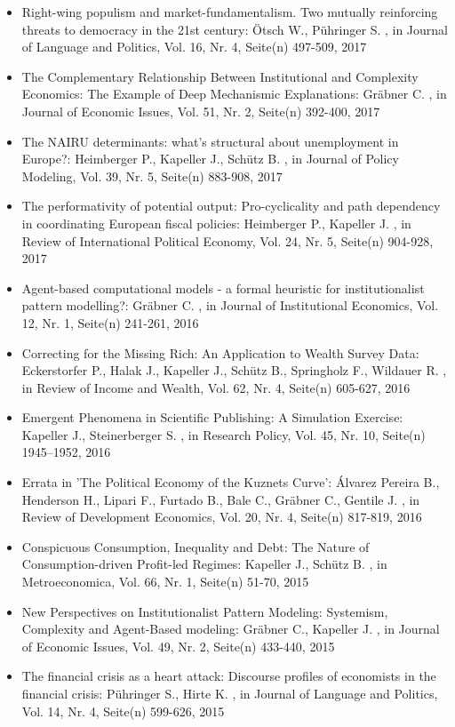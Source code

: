 \begin{itemize}
\item Right-wing populism and market-fundamentalism. Two mutually reinforcing threats to democracy in the 21st century: Ötsch W., Pühringer S. , in Journal of Language and Politics, Vol. 16, Nr. 4, Seite(n) 497-509, 2017
\item The Complementary Relationship Between Institutional and Complexity Economics: The Example of Deep Mechanismic Explanations: Gräbner C. , in Journal of Economic Issues, Vol. 51, Nr. 2, Seite(n) 392-400, 2017
\item The NAIRU determinants: what’s structural about unemployment in Europe?: Heimberger P., Kapeller J., Schütz B. , in Journal of Policy Modeling, Vol. 39, Nr. 5, Seite(n) 883-908, 2017
\item The performativity of potential output: Pro-cyclicality and path dependency in coordinating European fiscal policies: Heimberger P., Kapeller J. , in Review of International Political Economy, Vol. 24, Nr. 5, Seite(n) 904-928, 2017
\item Agent-based computational models - a formal heuristic for institutionalist pattern modelling?: Gräbner C. , in Journal of Institutional Economics, Vol. 12, Nr. 1, Seite(n) 241-261, 2016
\item Correcting for the Missing Rich: An Application to Wealth Survey Data: Eckerstorfer P., Halak J., Kapeller J., Schütz B., Springholz F., Wildauer R. , in Review of Income and Wealth, Vol. 62, Nr. 4, Seite(n) 605-627, 2016
\item Emergent Phenomena in Scientific Publishing: A Simulation Exercise: Kapeller J., Steinerberger S. , in Research Policy, Vol. 45, Nr. 10, Seite(n) 1945–1952, 2016
\item Errata in 'The Political Economy of the Kuznets Curve': Álvarez Pereira B., Henderson H., Lipari F., Furtado B., Bale C., Gräbner C., Gentile J. , in Review of Development Economics, Vol. 20, Nr. 4, Seite(n) 817-819, 2016
\item Conspicuous Consumption, Inequality and Debt: The Nature of Consumption-driven Profit-led Regimes: Kapeller J., Schütz B. , in Metroeconomica, Vol. 66, Nr. 1, Seite(n) 51-70, 2015
\item New Perspectives on  Institutionalist Pattern Modeling: Systemism, Complexity and  Agent-Based modeling: Gräbner C., Kapeller J. , in Journal of Economic Issues, Vol. 49, Nr. 2, Seite(n) 433-440, 2015
\item The financial crisis as a heart attack: Discourse profiles of economists in the financial crisis: Pühringer S., Hirte K. , in Journal of Language and Politics, Vol. 14, Nr. 4, Seite(n) 599-626, 2015

\end{itemize}
